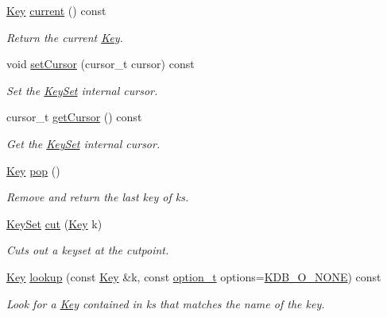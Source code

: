 \begin{DoxyCompactItemize}
\hyperlink{classkdb_1_1Key}{Key} \hyperlink{classkdb_1_1KeySet_a2c9c26dbbf5ec0ed82093e1793a79fe1}{current} () const 
\begin{DoxyCompactList}\small\item\em Return the current \hyperlink{classkdb_1_1Key}{Key}. \end{DoxyCompactList}\item 
void \hyperlink{classkdb_1_1KeySet_a844be268914882e5159424e9ee302119}{set\+Cursor} (cursor\+\_\+t cursor) const 
\begin{DoxyCompactList}\small\item\em Set the \hyperlink{classkdb_1_1KeySet}{Key\+Set} internal cursor. \end{DoxyCompactList}\item 
cursor\+\_\+t \hyperlink{classkdb_1_1KeySet_ab3b63a96df7100e58cbb812e3d4223f2}{get\+Cursor} () const 
\begin{DoxyCompactList}\small\item\em Get the \hyperlink{classkdb_1_1KeySet}{Key\+Set} internal cursor. \end{DoxyCompactList}\item 
\hyperlink{classkdb_1_1Key}{Key} \hyperlink{classkdb_1_1KeySet_a7f207457a1c12633a1a5301a3a1bbaed}{pop} ()
\begin{DoxyCompactList}\small\item\em Remove and return the last key of {\ttfamily ks}. \end{DoxyCompactList}\item 
\hyperlink{classkdb_1_1KeySet}{Key\+Set} \hyperlink{classkdb_1_1KeySet_ab283da798a7670d5c3f0e1a5b821e666}{cut} (\hyperlink{classkdb_1_1Key}{Key} k)
\begin{DoxyCompactList}\small\item\em Cuts out a keyset at the cutpoint. \end{DoxyCompactList}\item 
\hyperlink{classkdb_1_1Key}{Key} \hyperlink{classkdb_1_1KeySet_a816e7468abe296f8352e090738c215cc}{lookup} (const \hyperlink{classkdb_1_1Key}{Key} \&k, const \hyperlink{group__keyset_ga98a3d6a4016c9dad9cbd1a99a9c2a45a}{option\+\_\+t} options=\hyperlink{group__keyset_gga98a3d6a4016c9dad9cbd1a99a9c2a45aa00738455e0ae843c8720809d8287f370}{K\+D\+B\+\_\+\+O\+\_\+\+N\+O\+N\+E}) const 
\begin{DoxyCompactList}\small\item\em Look for a \hyperlink{classkdb_1_1Key}{Key} contained in {\ttfamily ks} that matches the name of the {\ttfamily key}. \end{DoxyCompactList}\item 

\end{DoxyCompactItemize}
